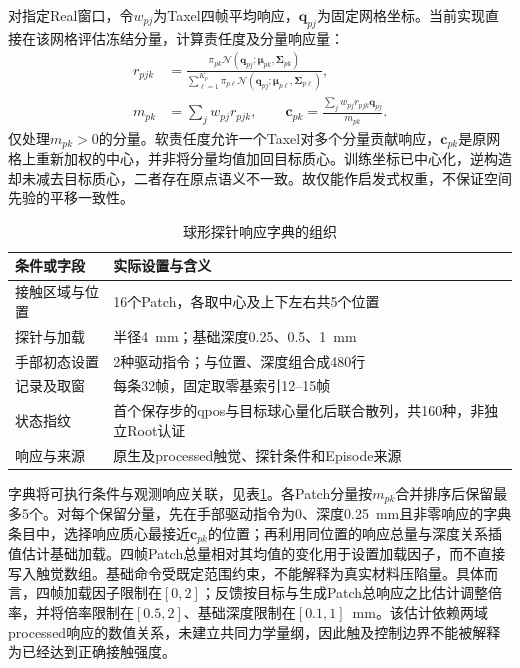 对指定Real窗口，令$w_{pj}$为Taxel四帧平均响应，$\boldsymbol q_{pj}$为固定网格坐标。当前实现直接在该网格评估冻结分量，计算责任度及分量响应量：
\begin{equation}
 \begin{aligned}
 r_{pjk}&=\frac{\pi_{pk}\mathcal N(\boldsymbol q_{pj};\boldsymbol\mu_{pk},\boldsymbol\Sigma_{pk})}
 {\sum_{\ell=1}^{K_p}\pi_{p\ell}\mathcal N(\boldsymbol q_{pj};\boldsymbol\mu_{p\ell},\boldsymbol\Sigma_{p\ell})},\\
 m_{pk}&=\sum_j w_{pj}r_{pjk},\qquad
 \boldsymbol c_{pk}=\frac{\sum_j w_{pj}r_{pjk}\boldsymbol q_{pj}}{m_{pk}}.
 \end{aligned}
 \label{eq:ch05_gmm_responsibility}
\end{equation}
仅处理$m_{pk}>0$的分量。软责任度允许一个Taxel对多个分量贡献响应，$\boldsymbol c_{pk}$是原网格上重新加权的中心，并非将分量均值加回目标质心。训练坐标已中心化，逆构造却未减去目标质心，二者存在原点语义不一致。故仅能作启发式权重，不保证空间先验的平移一致性。

\begin{table}[htbp]
 \centering\small
 \caption{球形探针响应字典的组织}
 \label{tab:ch05_probe_dictionary}
 \begin{tabular}{p{}p{}}
 \hline
 条件或字段 & 实际设置与含义\\
 \hline
 接触区域与位置 & 16个Patch，各取中心及上下左右共5个位置\\
 探针与加载 & 半径4~mm；基础深度0.25、0.5、1~mm\\
 手部初态设置 & 2种驱动指令；与位置、深度组合成480行\\
 记录及取窗 & 每条32帧，固定取零基索引12--15帧\\
 状态指纹 & 首个保存步的qpos与目标球心量化后联合散列，共160种，非独立Root认证\\
 响应与来源 & 原生及processed触觉、探针条件和Episode来源\\
 \hline
 \end{tabular}
\end{table}

字典将可执行条件与观测响应关联，见表\ref{tab:ch05_probe_dictionary}。各Patch分量按$m_{pk}$合并排序后保留最多5个。对每个保留分量，先在手部驱动指令为0、深度0.25~mm且非零响应的字典条目中，选择响应质心最接近$\boldsymbol c_{pk}$的位置；再利用同位置的响应总量与深度关系插值估计基础加载。四帧Patch总量相对其均值的变化用于设置加载因子，而不直接写入触觉数组。基础命令受既定范围约束，不能解释为真实材料压陷量。具体而言，四帧加载因子限制在$[0,2]$；反馈按目标与生成Patch总响应之比估计调整倍率，并将倍率限制在$[0.5,2]$、基础深度限制在$[0.1,1]$~mm。该估计依赖两域processed响应的数值关系，未建立共同力学量纲，因此触及控制边界不能被解释为已经达到正确接触强度。

